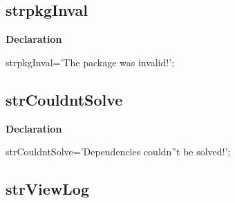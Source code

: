 \documentclass{report}
\newif\ifpdf
\begin{document}
\subsection*{strpkgInval}
\fi
\label{trstrings-strpkgInval}
\begin{list}{}{
\setlength{\itemindent}{0cm}
\setlength{\listparindent}{0cm}
\setlength{\leftmargin}{\evensidemargin}
\addtolength{\leftmargin}{\tmplength}
\settowidth{\labelsep}{X}
\addtolength{\leftmargin}{\labelsep}
\setlength{\labelwidth}{\tmplength}
}
\item[\textbf{Declaration}\hfill]
\ifpdf
\begin{flushleft}
\fi
\begin{ttfamily}
strpkgInval='The package was invalid!';\end{ttfamily}

\ifpdf
\end{flushleft}
\fi

\end{list}
\ifpdf
\subsection*{\large{\textbf{strCouldntSolve}}\normalsize\hspace{1ex}\hrulefill}
\else
\subsection*{strCouldntSolve}
\fi
\label{trstrings-strCouldntSolve}
\begin{list}{}{
\setlength{\itemindent}{0cm}
\setlength{\listparindent}{0cm}
\setlength{\leftmargin}{\evensidemargin}
\addtolength{\leftmargin}{\tmplength}
\settowidth{\labelsep}{X}
\addtolength{\leftmargin}{\labelsep}
\setlength{\labelwidth}{\tmplength}
}
\item[\textbf{Declaration}\hfill]
\ifpdf
\begin{flushleft}
\fi
\begin{ttfamily}
strCouldntSolve='Dependencies couldn''t be solved!';\end{ttfamily}

\ifpdf
\end{flushleft}
\fi

\end{list}
\ifpdf
\subsection*{\large{\textbf{strViewLog}}\normalsize\hspace{1ex}\hrulefill}
\else
\end{document}

